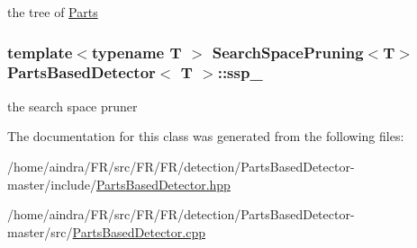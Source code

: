 the tree of \hyperlink{classParts}{\-Parts} 

\hypertarget{classPartsBasedDetector_aae91c693f9d01e3e6cbd552d7f81e474}{
\subsubsection[{ssp\-\_\-}]{\setlength{\rightskip}{0pt plus 5cm}template$<$typename T $>$ {\bf \-Search\-Space\-Pruning}$<$\-T$>$ {\bf \-Parts\-Based\-Detector}$<$ \-T $>$\-::{\bf ssp\-\_\-}}}\label{classPartsBasedDetector_aae91c693f9d01e3e6cbd552d7f81e474}


the search space pruner 



\-The documentation for this class was generated from the following files\-:\begin{DoxyCompactItemize}
\item 
/home/aindra/\-F\-R/src/\-F\-R/\-F\-R/detection/\-Parts\-Based\-Detector-\/master/include/\hyperlink{PartsBasedDetector_8hpp}{\-Parts\-Based\-Detector.\-hpp}\item 
/home/aindra/\-F\-R/src/\-F\-R/\-F\-R/detection/\-Parts\-Based\-Detector-\/master/src/\hyperlink{PartsBasedDetector_8cpp}{\-Parts\-Based\-Detector.\-cpp}\end{DoxyCompactItemize}
